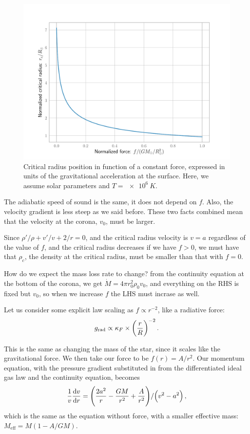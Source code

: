 \documentclass[main.tex]{subfiles}
\begin{document}
\begin{figure}[H]
\centering
\includegraphics[width=\textwidth]{figures/critical_radius_position.pdf}
\caption{Critical radius position in function of a constant force, expressed in units of the gravitational acceleration at the surface. Here, we assume solar parameters and \(T = \SI{e6}{K}\).}
\label{fig:critical_radius_position}
\end{figure}

The adiabatic speed of sound is the same, it does not depend on \(f\). Also, the velocity gradient is less steep as we said before. 
These two facts combined mean that the velocity at the corona, \(v_0 \), must be larger.

Since \(\rho' / \rho + v' / v + 2/r = 0\), and the critical radius velocity is \(v=a\) regardless of the value of \(f\), and the critical radius decreases if we have \(f>0\), we must have that \(\rho_{c}\), the density at the critical radius, must be smaller than that with \(f=0\).

How do we expect the mass loss rate to change? from the continuity equation at the bottom of the corona, we get \(\dot{M} = 4 \pi r_0^2 \rho_0 v_0 \), and everything on the RHS is fixed but \(v_0 \), so when we increase \(f\) the LHS must incrase as well. 

Let us consider some explicit law scaling as \(f \propto r^{-2}\), like a radiative force: 
%
\begin{align}
  g _{\text{rad}} \propto \kappa_F  \times \qty(\frac{r}{R})^{-2}
\,.
\end{align}

This is the same as changing the mass of the star, since it scales like the gravitational force. We then take our force to be \(f(r) = A / r^2\). Our momentum equation, with the pressure gradient substituted in from the differentiated ideal gas law and the continuity equation, becomes
%
\begin{align}
  \frac{1}{v} \dv{v}{r}  = \qty(\frac{2 a^2}{r} - \frac{GM}{r^2} + \frac{A}{r^2}) / \qty(v^2- a^2)
\,,
\end{align}
%
which is the same as the equation without force, with a smaller effective mass:
\(M _{\text{eff}} = M ( 1- A / GM)\).
\end{document}
